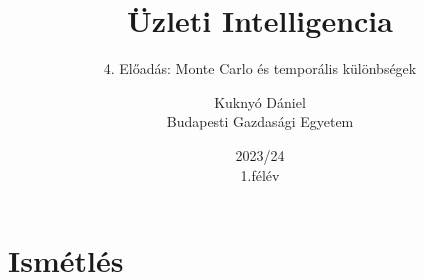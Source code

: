 \documentclass[english, aspectratio=169]{beamer}
\makeatletter
\newcommand\makebeamertitle{\frame{\maketitle}}
\let\origtableofcontents=\tableofcontents
\def\tableofcontents{\@ifnextchar[{\origtableofcontents}{\gobbletableofcontents}}
\def\gobbletableofcontents#1{\origtableofcontents}
\makeatother
\begin{document}
\section{Ismétlés}
\title[]{Üzleti Intelligencia}
\subtitle{4. Előadás: Monte Carlo és temporális különbségek}
\author[Kuknyó Dániel]{Kuknyó Dániel\\Budapesti Gazdasági Egyetem}
\date{2023/24\\1.félév}
\makebeamertitle

\begin{frame}
\tableofcontents{}
\end{frame}

\begin{frame}
\tableofcontents[currentsection]
\end{frame}
\end{document}
